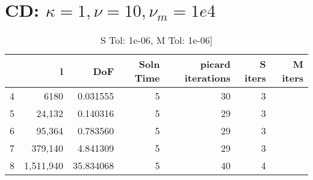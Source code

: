 \documentclass{article}
\begin{document}
\section*{CD: $\kappa = 1,\nu = 10, \nu_m = 1e4$}
\begin{table}[h!] \small
\begin{center}
\begin{tabular}{lrrrrrr}
\hline
{} &  l &      DoF &  Soln Time &  picard iterations &  S iters &  M iters \\
\hline
 4 &     6180 &   0.031555 &                  5 &        30 &        3 \\
 5 &    24,132 &   0.140316 &                  5 &        29 &        3 \\
 6 &    95,364 &   0.783560 &                  5 &        29 &        3 \\
 7 &   379,140 &   4.841309 &                  5 &        29 &        3 \\
 8 &  1,511,940 &  35.834068 &                  5 &        40 &        4 \\
\hline
\end{tabular}
\caption{S Tol:   1e-06, M Tol:    1e-06]}

\end{center}
\end{table}
\end{document}
